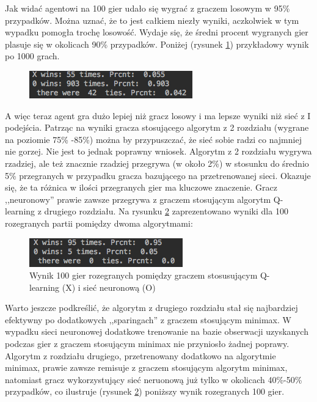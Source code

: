 \documentclass[licencjacka]{pracamgr}
\begin{document}
Jak widać agentowi na 100 gier udało się wygrać z graczem losowym w 95\% przypadków.  Można uznać, że to jest całkiem niezły wyniki, aczkolwiek w tym wypadku pomogła trochę losowość. Wydaje się, że średni procent wygranych gier plasuje się w okolicach 90\% przypadków. Poniżej (rysunek \ref{Rys31}) przykładowy wynik po 1000 grach. \\

\begin{figure}[h!]
	\includegraphics [scale=0.7] {nn2_2.png}
	\caption{}
	\label{Rys31}
\end{figure} 

A więc teraz agent gra dużo lepiej niż gracz losowy i ma lepsze wyniki niż sieć z I podejścia. Patrząc na wyniki gracza stosującego algorytm z 2 rozdziału (wygrane na poziomie 75\% -85\%)   można by przypuszczać, że sieć sobie radzi co najmniej nie gorzej. Nie jest to jednak poprawny wniosek. Algorytm z 2 rozdziału wygrywa rzadziej, ale też znacznie rzadziej przegrywa (w około 2\%) w stosunku do średnio 5\% przegranych w przypadku gracza bazującego na przetrenowanej sieci. Okazuje się, że ta różnica w ilości przegranych gier ma kluczowe znaczenie. Gracz ,,neuronowy'' prawie zawsze  przegrywa z graczem stosującym algorytm Q-learning z drugiego rozdziału. Na rysunku \ref{Rys32} zaprezentowano wyniki dla 100 rozegranych partii pomiędzy dwoma algorytmami:

\begin{figure}[h!]
	\includegraphics [scale=0.7] {nn2_3.png}
	\caption{Wynik 100 gier rozegranych pomiędzy graczem stosusującym Q-learning (X) i sieć neuronową (O)}
	\label{Rys32}
\end{figure} 

Warto jeszcze podkreślić, że algorytm z drugiego rozdziału stał się najbardziej efektywny po dodatkowych ,,sparingach'' z graczem  stosującym minimax. W wypadku sieci neuronowej dodatkowe trenowanie na bazie obserwacji uzyskanych podczas gier z graczem stosującym minimax nie przyniosło żadnej poprawy. Algorytm z rozdziału drugiego, przetrenowany dodatkowo na algorytmie minimax, prawie zawsze remisuje z graczem stosującym algorytm minimax, natomiast gracz wykorzystujący sieć neruonową już tylko w okolicach 40\%-50\% przypadków, co ilustruje (rysunek \ref{Rys32}) poniższy wynik rozegranych 100 gier.
\end{document}
